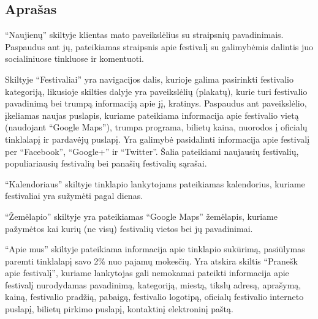 \documentclass{VUMIFPSkursinis}
\begin{document}
\subsection{Aprašas}



“Naujienų” skiltyje klientas mato paveikslėlius su straipsnių pavadinimais.
Paspaudus ant jų, pateikiamas straipsnis apie festivalį su galimybėmis dalintis juo socialiniuose tinkluose ir komentuoti. 

Skiltyje “Festivaliai” yra navigacijos dalis, kurioje galima pasirinkti festivalio kategoriją, likusioje skilties dalyje yra paveikslėlių (plakatų), kurie turi festivalio pavadinimą bei trumpą informaciją apie jį, kratinys. Paspaudus ant paveikslėlio, įkeliamas naujas puslapis, kuriame pateikiama informacija apie festivalio vietą (naudojant “Google Maps”), trumpa programa, bilietų kaina, nuorodos į oficialų tinklalapį ir pardavėjų puslapį. Yra galimybė pasidalinti informacija apie festivalį per “Facebook”, “Google+” ir “Twitter”. Šalia pateikiami naujausių festivalių, populiariausių festivalių bei panašių festivalių sąrašai. 

“Kalendoriaus” skiltyje tinklapio lankytojams pateikiamas kalendorius, kuriame festivaliai yra sužymėti pagal dienas.

“Žemėlapio”  skiltyje yra pateikiamas “Google Maps” žemėlapis, kuriame pažymėtos kai kurių (ne visų) festivalių vietos bei jų pavadinimai.
 
“Apie mus” skiltyje pateikiama informacija apie tinklapio sukūrimą, pasiūlymas paremti tinklalapį savo 2\% nuo pajamų mokesčių.
Yra atskira skiltis “Pranešk apie festivalį”, kuriame lankytojas gali nemokamai pateikti informacija apie festivalį nurodydamas pavadinimą, kategoriją, miestą, tikslų adresą, aprašymą, kainą, festivalio pradžią, pabaigą, festivalio logotipą, oficialų festivalio interneto puslapį, bilietų pirkimo puslapį, kontaktinį elektroninį paštą. 
\end{document}
